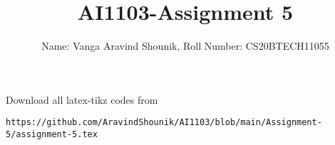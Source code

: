 \documentclass[journal,12pt,twocolumn]{IEEEtran}
\DeclareMathOperator*{\Res}{Res}
\begin{document}
\newcommand{\BEQA}{\begin{eqnarray}}
\newcommand{\EEQA}{\end{eqnarray}}
\newcommand{\define}{\stackrel{\triangle}{=}}

\raggedbottom
\setlength{\parindent}{0pt}
\providecommand{\mbf}{\mathbf}
\providecommand{\pr}[1]{\ensuremath{\Pr\left(#1\right)}}
\providecommand{\qfunc}[1]{\ensuremath{Q\left(#1\right)}}
\providecommand{\sbrak}[1]{\ensuremath{{}\left[#1\right]}}
\providecommand{\lsbrak}[1]{\ensuremath{{}\left[#1\right.}}
\providecommand{\rsbrak}[1]{\ensuremath{{}\left.#1\right]}}
\providecommand{\brak}[1]{\ensuremath{\left(#1\right)}}
\providecommand{\lbrak}[1]{\ensuremath{\left(#1\right.}}
\providecommand{\rbrak}[1]{\ensuremath{\left.#1\right)}}
\providecommand{\cbrak}[1]{\ensuremath{\left\{#1\right\}}}
\providecommand{\lcbrak}[1]{\ensuremath{\left\{#1\right.}}
\providecommand{\rcbrak}[1]{\ensuremath{\left.#1\right\}}}
\theoremstyle{remark}
\newtheorem{rem}{Remark}
\newcommand{\sgn}{\mathop{\mathrm{sgn}}}
\providecommand{\abs}[1]{\vert#1\vert}
\providecommand{\res}[1]{\Res\displaylimits_{#1}} 
\providecommand{\norm}[1]{\lVert#1\rVert}
\providecommand{\mtx}[1]{\mathbf{#1}}
\providecommand{\mean}[1]{E[ #1 ]}
\providecommand{\fourier}{\overset{\mathcal{F}}{ \rightleftharpoons}}
\providecommand{\system}{\overset{\mathcal{H}}{ \longleftrightarrow}}
\newcommand{\solution}{\noindent \textbf{Solution: }}
\newcommand{\cosec}{\,\text{cosec}\,}
\providecommand{\dec}[2]{\ensuremath{\overset{#1}{\underset{#2}{\gtrless}}}}
\newcommand{\myvec}[1]{\ensuremath{\begin{pmatrix}#1\end{pmatrix}}}
\newcommand{\mydet}[1]{\ensuremath{\begin{vmatrix}#1\end{vmatrix}}}
\makeatletter
{}
\makeatother
\let\StandardTheFigure\thefigure
\let\vec\mathbf
\renewcommand{\thefigure}{\theproblem}
\def\putbox#1#2#3{\makebox[0in][l]{\makebox[#1][l]{}\raisebox{\baselineskip}[0in][0in]{\raisebox{#2}[0in][0in]{#3}}}}
     \def\rightbox#1{\makebox[0in][r]{#1}}
     \def\centbox#1{\makebox[0in]{#1}}
     \def\topbox#1{\raisebox{-\baselineskip}[0in][0in]{#1}}
     \def\midbox#1{\raisebox{-0.5\baselineskip}[0in][0in]{#1}}
\vspace{3cm}
\title{AI1103-Assignment 5}
\author{Name: Vanga Aravind Shounik, Roll Number: CS20BTECH11055}
\maketitle
\newpage
\bigskip
\renewcommand{\thefigure}{\theenumi}
\renewcommand{\thetable}{\theenumi}
%
Download all latex-tikz codes from 
%
\begin{lstlisting}
https://github.com/AravindShounik/AI1103/blob/main/Assignment-5/assignment-5.tex
\end{lstlisting}
\end{document}
